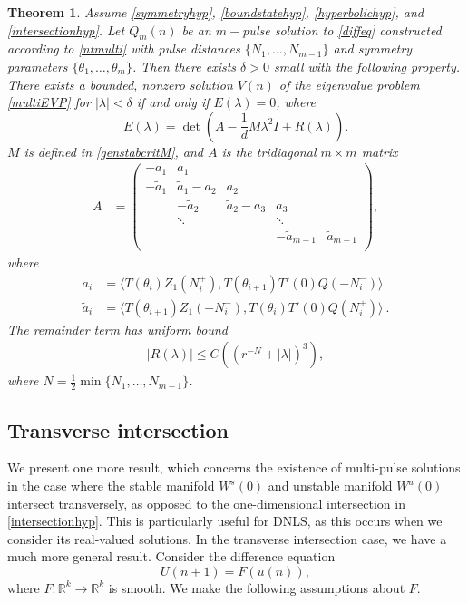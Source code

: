 \documentclass[12pt]{elsarticle}
\def\R{{\mathbb R}}
\newtheorem{theorem}{Theorem}
\begin{document}
\begin{theorem}\label{stabilitytheorem}
Assume \cref{symmetryhyp}, \cref{boundstatehyp}, \cref{hyperbolichyp}, and \cref{intersectionhyp}. Let $Q_m(n)$ be an $m-$pulse solution to \cref{diffeq} constructed according to \cref{ntmulti} with pulse distances $\{ N_1, \dots, N_{m-1}\}$ and symmetry parameters $\{\theta_1, \dots, \theta_m\}$. Then there exists $\delta > 0$ small with the following property. There exists a bounded, nonzero solution $V(n)$ of the eigenvalue problem \cref{multiEVP} for $|\lambda| < \delta$ if and only if $E(\lambda) = 0$, where
\begin{equation}\label{Elambda}
E(\lambda) = \det\left(A - \frac{1}{d}M \lambda^2 I + R(\lambda)\right).
\end{equation}
$M$ is defined in \eqref{genstabcritM}, and $A$ is the tridiagonal $m \times m$ matrix
\begin{align}\label{matrixA}
A &= \begin{pmatrix}
-a_1 & a_1 & & & \\
-\tilde{a}_1 & \tilde{a}_1 - a_2 & a_2 \\
& -\tilde{a}_2 & \tilde{a}_2 - a_3 & a_3 \\
& \ddots & & \ddots \\
& & & -\tilde{a}_{m-1} & \tilde{a}_{m-1}  \\
\end{pmatrix},
\end{align}
where
\begin{align*}
a_i &= \langle T(\theta_i) Z_1(N_i^+), T(\theta_{i+1}) T'(0)Q(-N_i^-) \rangle \\
\tilde{a}_i &= \langle T(\theta_{i+1}) Z_1(-N_i^-), T(\theta_i) T'(0)Q(N_i^+) \rangle \:.
\end{align*}
The remainder term has uniform bound
\begin{align}\label{Rbound2}
|R(\lambda)| \leq C\left( (r^{-N} + |\lambda|)^3 \right),
\end{align}
where $N = \frac{1}{2}\min\{N_1, \dots, N_{m-1} \}$.
\end{theorem}

\subsection{Transverse intersection}

We present one more result, which concerns the existence of multi-pulse solutions in the case where the stable manifold $W^s(0)$ and unstable manifold $W^u(0)$ intersect transversely, as opposed to the one-dimensional intersection in \cref{intersectionhyp}. This is particularly useful for DNLS, as this occurs when we consider its real-valued solutions. In the transverse intersection case, we have a much more general result. Consider the difference equation
\begin{equation}\label{diffeqtransv}
U(n+1) = F(u(n)),
\end{equation}
where $F: \R^k \rightarrow \R^k$ is smooth. We make the following assumptions about $F$.
\end{document}
